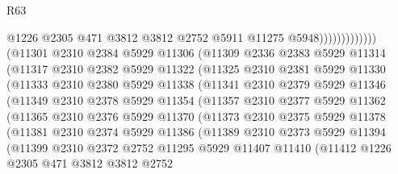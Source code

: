 \begin{lexlean}{R63}
\begin{coremodule}
                                  @1226
                                  @2305
                                  @471
                                  @3812
                                  @3812
                                  @2752
                                  @5911
                                  @11275
                                  @5948)))))))))))))
        (@11301
          @2310
          @2384
          @5929
          @11306
          (@11309
            @2336
            @2383
            @5929
            @11314
            (@11317
              @2310
              @2382
              @5929
              @11322
              (@11325
                @2310
                @2381
                @5929
                @11330
                (@11333
                  @2310
                  @2380
                  @5929
                  @11338
                  (@11341
                    @2310
                    @2379
                    @5929
                    @11346
                    (@11349
                      @2310
                      @2378
                      @5929
                      @11354
                      (@11357
                        @2310
                        @2377
                        @5929
                        @11362
                        (@11365
                          @2310
                          @2376
                          @5929
                          @11370
                          (@11373
                            @2310
                            @2375
                            @5929
                            @11378
                            (@11381
                              @2310
                              @2374
                              @5929
                              @11386
                              (@11389
                                @2310
                                @2373
                                @5929
                                @11394
                                (@11399
                                  @2310
                                  @2372
                                  @2752
                                  @11295
                                  @5929
                                  @11407
                                  @11410
                                  (@11412
                                    @1226
                                    @2305
                                    @471
                                    @3812
                                    @3812
                                    @2752

\end{coremodule}
\end{lexlean}
